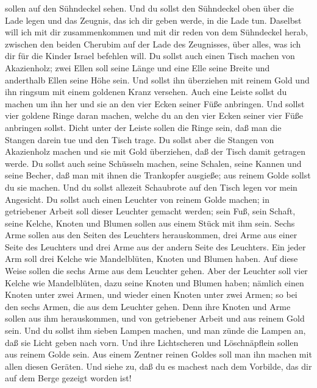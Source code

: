 sollen auf den Sühndeckel sehen.  Und du sollst den
Sühndeckel oben über die Lade legen und das Zeugnis, das ich dir geben
werde, in die Lade tun.  Daselbst will ich mit dir
zusammenkommen und mit dir reden von dem Sühndeckel herab, zwischen den
beiden Cherubim auf der Lade des Zeugnisses, über alles, was ich dir für
die Kinder Israel befehlen will.  Du sollst auch einen
Tisch machen von Akazienholz; zwei Ellen soll seine Länge und eine Elle
seine Breite und anderthalb Ellen seine Höhe sein.  Und
sollst ihn überziehen mit reinem Gold und ihn ringsum mit einem goldenen
Kranz versehen.  Auch eine Leiste sollst du machen um ihn
her und sie an den vier Ecken seiner Füße anbringen.  Und
sollst vier goldene Ringe daran machen, welche du an den vier Ecken
seiner vier Füße anbringen sollst.  Dicht unter der
Leiste sollen die Ringe sein, daß man die Stangen darein tue und den
Tisch trage.  Du sollst aber die Stangen von Akazienholz
machen und sie mit Gold überziehen, daß der Tisch damit getragen werde.
 Du sollst auch seine Schüsseln machen, seine Schalen,
seine Kannen und seine Becher, daß man mit ihnen die Trankopfer
ausgieße; aus reinem Golde sollst du sie machen.  Und du
sollst allezeit Schaubrote auf den Tisch legen vor mein Angesicht.
 Du sollst auch einen Leuchter von reinem Golde machen;
in getriebener Arbeit soll dieser Leuchter gemacht werden; sein Fuß,
sein Schaft, seine Kelche, Knoten und Blumen sollen aus einem Stück mit
ihm sein.  Sechs Arme sollen aus den Seiten des Leuchters
herauskommen, drei Arme aus einer Seite des Leuchters und drei Arme aus
der andern Seite des Leuchters.  Ein jeder Arm soll drei
Kelche wie Mandelblüten, Knoten und Blumen haben. Auf diese Weise sollen
die sechs Arme aus dem Leuchter gehen.  Aber der Leuchter
soll vier Kelche wie Mandelblüten, dazu seine Knoten und Blumen haben;
 nämlich einen Knoten unter zwei Armen, und wieder einen
Knoten unter zwei Armen; so bei den sechs Armen, die aus dem Leuchter
gehen.  Denn ihre Knoten und Arme sollen aus ihm
herauskommen, und von getriebener Arbeit und aus reinem Gold sein.
 Und du sollst ihm sieben Lampen machen, und man zünde
die Lampen an, daß sie Licht geben nach vorn.  Und ihre
Lichtscheren und Löschnäpflein sollen aus reinem Golde sein.
 Aus einem Zentner reinen Goldes soll man ihn machen mit
allen diesen Geräten.  Und siehe zu, daß du es machest
nach dem Vorbilde, das dir auf dem Berge gezeigt worden ist!

